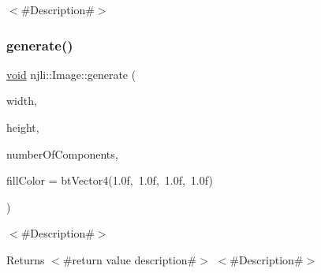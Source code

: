 $<$\#\+Description\#$>$ \mbox{\label{classnjli_1_1_image_abb8f6bfcdfd719dfe34d983157c352e5}} 
\subsubsection{\texorpdfstring{generate()}{generate()}}
{\footnotesize\ttfamily \mbox{\hyperlink{_thread_8h_af1e856da2e658414cb2456cb6f7ebc66}{void}} njli\+::\+Image\+::generate (\begin{DoxyParamCaption}\item[{\mbox{\hyperlink{_util_8h_a10e94b422ef0c20dcdec20d31a1f5049}{u32}}}]{width,  }\item[{\mbox{\hyperlink{_util_8h_a10e94b422ef0c20dcdec20d31a1f5049}{u32}}}]{height,  }\item[{\mbox{\hyperlink{_util_8h_aed742c436da53c1080638ce6ef7d13de}{u8}}}]{number\+Of\+Components,  }\item[{const bt\+Vector4 \&}]{fill\+Color = {\ttfamily btVector4(1.0f,~1.0f,~1.0f,~1.0f)} }\end{DoxyParamCaption})}

$<$\#\+Description\#$>$

\begin{DoxyReturn}{Returns}
$<$\#return value description\#$>$ $<$\#\+Description\#$>$
\end{DoxyReturn}

